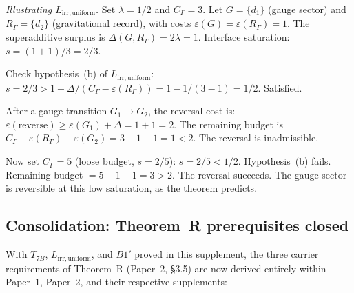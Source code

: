 \documentclass[11pt]{article}
\theoremstyle{definition}
\newcommand{\eps}{\varepsilon}
\begin{document}
\smallskip\noindent\textit{Illustrating $L_{\mathrm{irr,uniform}}$.}\quad
Set $\lambda = 1/2$ and $C_\Gamma = 3$.
Let $G = \{d_1\}$ (gauge sector) and $R_\Gamma = \{d_2\}$ (gravitational
record), with costs $\eps(G) = \eps(R_\Gamma) = 1$.
The superadditive surplus is $\Delta(G, R_\Gamma) = 2\lambda = 1$.
Interface saturation: $s = (1 + 1)/3 = 2/3$.

Check hypothesis~(b) of $L_{\mathrm{irr,uniform}}$:
$s = 2/3 > 1 - \Delta/(C_\Gamma - \eps(R_\Gamma))
= 1 - 1/(3 - 1) = 1/2$.  Satisfied.

After a gauge transition $G_1 \to G_2$, the reversal cost is:
$\eps(\text{reverse}) \ge \eps(G_1) + \Delta = 1 + 1 = 2$.
The remaining budget is $C_\Gamma - \eps(R_\Gamma) - \eps(G_2)
= 3 - 1 - 1 = 1 < 2$.  The reversal is inadmissible.

Now set $C_\Gamma = 5$ (loose budget, $s = 2/5$):
$s = 2/5 < 1/2$.  Hypothesis~(b) fails.
Remaining budget $= 5 - 1 - 1 = 3 > 2$.  The reversal succeeds.
The gauge sector is reversible at this low saturation, as the theorem
predicts.


\subsection{Consolidation: Theorem~R prerequisites closed}
\label{sec:TR_closed}

With $T_{7B}$, $L_{\mathrm{irr,uniform}}$, and $B1'$ proved in this
supplement, the three carrier requirements of Theorem~R
(Paper~2, §3.5) are now derived entirely within Paper~1, Paper~2, and
their respective supplements:

\smallskip
\begin{center}
\small
\renewcommand{\arraystretch}{1.15}
\end{center}
\end{document}
